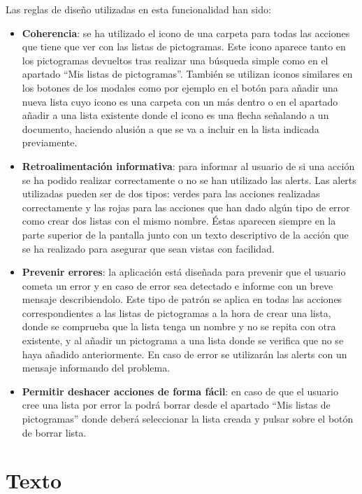 Las reglas de diseño utilizadas en esta funcionalidad han sido:
\begin{itemize}
	\item \textbf{Coherencia}: se ha utilizado el icono de una carpeta para todas las acciones que tiene que ver con las listas de pictogramas. Este icono aparece tanto en los pictogramas devueltos tras realizar una búsqueda simple como en el apartado “Mis listas de pictogramas”.  También se utilizan iconos similares en los botones de los modales como por ejemplo en el botón para añadir una nueva lista cuyo icono es una carpeta con un más dentro o en el apartado añadir a una lista existente donde el icono es una flecha señalando a un documento, haciendo alusión a que se va a incluir en la lista indicada previamente.
	
	\item \textbf{Retroalimentación informativa}: para informar al usuario de si una acción se ha podido realizar correctamente o no se han utilizado las alerts. Las alerts utilizadas pueden ser de dos tipos: verdes para las acciones realizadas correctamente y las rojas para las acciones que han dado algún tipo de error como crear dos listas con el mismo nombre. Éstas aparecen siempre en la parte superior de la pantalla junto con un texto descriptivo de la acción que se ha realizado para asegurar que sean vistas con facilidad.
	
	\item \textbf{Prevenir errores}: la aplicación está diseñada para prevenir que el usuario cometa un error y en caso de error sea detectado e informe con un breve mensaje describiendolo. Este tipo de patrón se aplica en todas las acciones correspondientes a las listas de pictogramas a la hora de crear una lista, donde se comprueba que la lista tenga un nombre y no se repita con otra existente, y al añadir un pictograma a una lista donde se verifica que no se haya añadido anteriormente. En caso de error se utilizarán las alerts con un mensaje informando del problema.
	
	
	\item \textbf{Permitir deshacer acciones de forma fácil}: en caso de que el usuario cree una lista por error la podrá borrar desde el apartado “Mis listas de pictogramas” donde deberá seleccionar la lista creada y pulsar sobre el botón de borrar lista.
	
\end{itemize}


\section{Texto}

